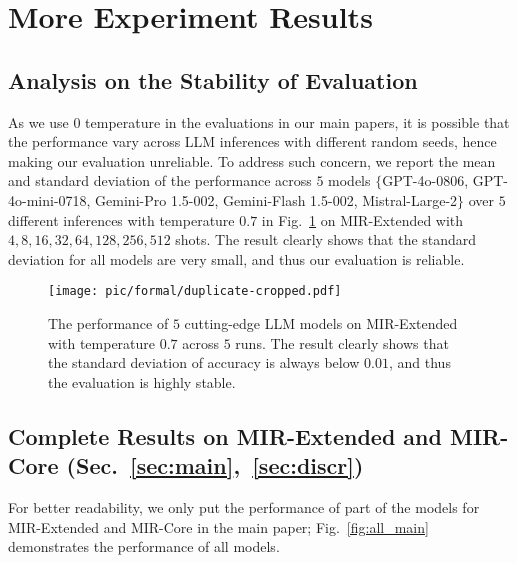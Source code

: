 \section{More Experiment Results}
\label{sec:extraexp}
\subsection{Analysis on the Stability of Evaluation}
\label{sec:ablation_std}

As we use $0$ temperature in the evaluations in our main papers, it is possible that the performance vary across LLM inferences with different random seeds, hence making our evaluation unreliable. To address such concern, we report the mean and standard deviation of the performance across $5$ models $\{$GPT-4o-0806, GPT-4o-mini-0718, Gemini-Pro 1.5-002, Gemini-Flash 1.5-002, Mistral-Large-2$\}$ over $5$ different inferences with temperature $0.7$ in Fig.~\ref{fig:ablation_std} on MIR-Extended with ${4, 8, 16, 32, 64, 128, 256, 512}$ shots. The result clearly shows that the standard deviation for all models are very small, and thus our evaluation is reliable.

\begin{figure}
    \centering
    \texttt{[image: pic/formal/duplicate-cropped.pdf]}
    \caption{The performance of $5$ cutting-edge LLM models on MIR-Extended with temperature $0.7$ across $5$ runs. The result clearly shows that the standard deviation of accuracy is always below $0.01$, and thus the evaluation is highly stable.}
    \label{fig:ablation_std}
\end{figure}

\subsection{Complete Results on MIR-Extended and MIR-Core (Sec.~\ref{sec:main},~\ref{sec:discr})}
\label{sec:all_main}
For better readability, we only put the performance of part of the models for MIR-Extended and MIR-Core in the main paper; Fig.~\ref{fig:all_main} demonstrates the performance of all models. 

